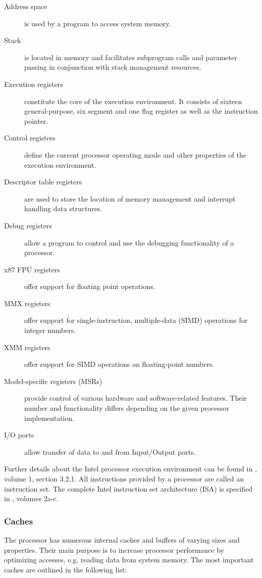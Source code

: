 \begin{description}
	\item[Address space] is used by a program to access system memory.
	\item[Stack] is located in memory and facilitates subprogram calls and
		parameter passing in conjunction with stack management resources.
	\item[Execution registers] constitute the core of the execution environment.
		It consists of sixteen general-purpose, six segment and one flag
		register as well as the instruction pointer.
	\item[Control registers] define the current processor operating mode and
		other properties of the execution environment.
	\item[Descriptor table registers] are used to store the location of memory
		management and interrupt handling data structures.
	\item[Debug registers] allow a program to control and use the debugging
		functionality of a processor.
	\item[x87 FPU registers] offer support for floating point operations.
	\item[MMX registers] offer support for single-instruction, multiple-data
		(SIMD) operations for integer numbers.
	\item[XMM registers] offer support for SIMD operations on floating-point
		numbers.
	\item[Model-specific registers (MSRs)] provide control of various hardware
		and software-related features. Their number and functionality differs
		depending on the given processor implementation.
	\item[I/O ports] allow transfer of data to and from Input/Output ports.
\end{description}

Further details about the Intel processor execution environment can be found in
\cite{IntelSDM}, volume 1, section 3.2.1. All instructions provided by a
processor are called an instruction set. The complete Intel instruction set
architecture (ISA) is specified in \cite{IntelSDM}, volumes 2a-c.

\subsubsection{Caches}
The processor has numerous internal caches and buffers of varying sizes and
properties. Their main purpose is to increase processor performance by
optimizing accesses, e.g. reading data from system memory. The most important
caches are outlined in the following list:

